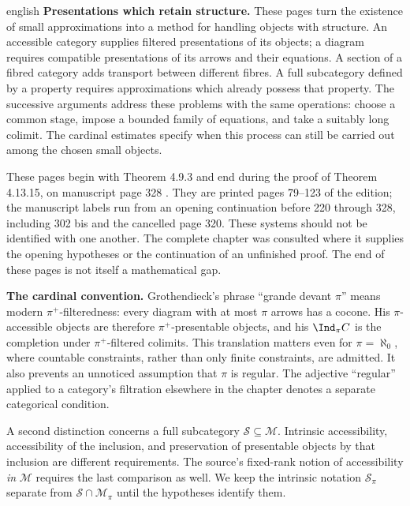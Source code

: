 \begin{otherlanguage*}{english}
\noindent\textbf{Presentations which retain structure.}
These pages turn the existence of small approximations into a method for handling objects with structure. An accessible category supplies filtered presentations of its objects; a diagram requires compatible presentations of its arrows and their equations. A section of a fibred category adds transport between different fibres. A full subcategory defined by a property requires approximations which already possess that property. The successive arguments address these problems with the same operations: choose a common stage, impose a bounded family of equations, and take a suitably long colimit. The cardinal estimates specify when this process can still be carried out among the chosen small objects.

These pages begin with Theorem 4.9.3 and end during the proof of Theorem 4.13.15, on manuscript page 328 \citep{Grothendieck1990XVIII}. They are printed pages 79--123 of the edition; the manuscript labels run from an opening continuation before 220 through 328, including 302 bis and the cancelled page 320. These systems should not be identified with one another. The complete chapter was consulted where it supplies the opening hypotheses or the continuation of an unfinished proof. The end of these pages is not itself a mathematical gap.

\medskip\noindent\textbf{The cardinal convention.}
Grothendieck's phrase ``grande devant $\pi$'' means modern $\pi^+$-filteredness: every diagram with at most $\pi$ arrows has a cocone. His $\pi$-accessible objects are therefore $\pi^+$-presentable objects, and his $\Ind_\pi C$ is the completion under $\pi^+$-filtered colimits. This translation matters even for $\pi=\aleph_0$, where countable constraints, rather than only finite constraints, are admitted. It also prevents an unnoticed assumption that $\pi$ is regular. The adjective ``regular'' applied to a category's filtration elsewhere in the chapter denotes a separate categorical condition.

A second distinction concerns a full subcategory $\mathcal S\subseteq\mathcal M$. Intrinsic accessibility, accessibility of the inclusion, and preservation of presentable objects by that inclusion are different requirements. The source's fixed-rank notion of accessibility \emph{in} $\mathcal M$ requires the last comparison as well. We keep the intrinsic notation $\mathcal S_\pi$ separate from $\mathcal S\cap\mathcal M_\pi$ until the hypotheses identify them.


\end{otherlanguage*}
